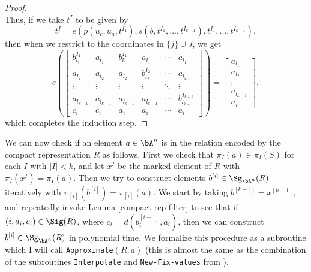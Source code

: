 \begin{proof}
\[\]
Thus, if we take $t^I$ to be given by
\[
t^I = e(p(u_c,u_a,t^{I_1}), s(b, t^{I_1}, ..., t^{I_{k-1}}), t^{I_1}, ..., t^{I_{k-1}}),
\]
then when we restrict to the coordinates in $\{j\} \cup J$, we get
\[
e\left(\begin{bmatrix} b^{I_1}_{l_1} & a_{l_1} & b^{I_1}_{l_1} & a_{l_1} & \cdots & a_{l_1}\\ a_{l_2} & a_{l_2} & a_{l_2} & b^{I_2}_{l_2} & \cdots & a_{l_2}\\ \vdots & \vdots & \vdots & \vdots & \ddots & \vdots\\ a_{l_{k-1}} & a_{l_{k-1}} & a_{l_{k-1}} & a_{l_{k-1}} & \cdots & b^{I_{k-1}}_{l_{k-1}}\\ c_i & c_i & a_i & a_i & \cdots & a_i\end{bmatrix}\right) = \begin{bmatrix} a_{l_1}\\ a_{l_2}\\ \vdots\\ a_{l_{k-1}}\\ a_i\end{bmatrix},
\]
which completes the induction step.
\end{proof}

We can now check if an element $a \in \bA^n$ is in the relation encoded by the compact representation $R$ as follows. First we check that $\pi_I(a) \in \pi_I(S)$ for each $I$ with $|I| < k$, and let $x^I$ be the marked element of $R$ with $\pi_I(x^I) = \pi_I(a)$. Then we try to construct elements $b^{[i]} \in \Sg_{\bA^n}(R)$ iteratively with $\pi_{[i]}(b^{[i]})= \pi_{[i]}(a)$. We start by taking $b^{[k-1]} = x^{[k-1]}$, and repeatedly invoke Lemma \ref{compact-rep-filter} to see that if $(i,a_i,c_i) \in \Sig(R)$, where $c_i = d(b^{[i-1]}_i,a_i)$, then we can construct $b^{[i]} \in \Sg_{\bA^n}(R)$ in polynomial time. We formalize this procedure as a subroutine which I will call \texttt{Approximate}$(R,a)$ (this is almost the same as the combination of the subroutines \texttt{Interpolate} and \texttt{New-Fix-values} from \cite{few-subpowers-algorithm}).%

